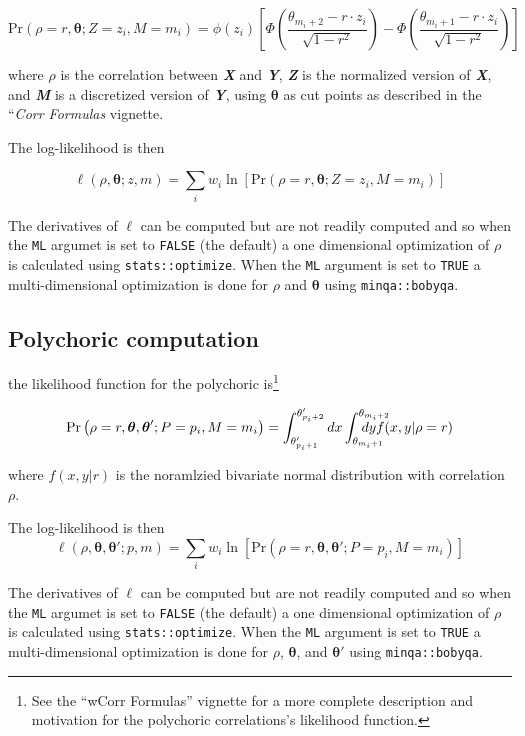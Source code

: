 \documentclass[]{article}
\let\rmarkdownfootnote\footnote%
\def\footnote{\protect\rmarkdownfootnote}
\begin{document}
\[\mathrm{Pr}\left( \rho=r, \boldsymbol{\theta} ; Z=z_i, M=m_i \right) = \phi(z_i) \left[ \Phi\left( \frac{\theta_{m_i+2} - r \cdot z_i}{\sqrt{1-r^2}} \right) - \Phi \left( \frac{\theta_{m_i+1} - r \cdot z_i}{\sqrt{1-r^2}} \right) \right]\]

where \(\rho\) is the correlation between \textbf{\emph{X}} and
\textbf{\emph{Y}}, \textbf{\emph{Z}} is the normalized version of
\textbf{\emph{X}}, and \textbf{\emph{M}} is a discretized version of
\textbf{\emph{Y}}, using \(\boldsymbol{\theta}\) as cut points as
described in the ``\emph{Corr Formulas} vignette.

The log-likelihood is then

\[\ell(\rho, \boldsymbol{\theta};z,m) = \sum_i w_i \ln\left[ \mathrm{Pr}\left( \rho=r, \boldsymbol{\theta} ; Z=z_i, M=m_i \right) \right]\]

The derivatives of \(\ell\) can be computed but are not readily computed
and so when the \texttt{ML} argumet is set to \texttt{FALSE} (the
default) a one dimensional optimization of \(\rho\) is calculated using
\texttt{stats::optimize}. When the \texttt{ML} argument is set to
\texttt{TRUE} a multi-dimensional optimization is done for \(\rho\) and
\(\boldsymbol{\theta}\) using \texttt{minqa::bobyqa}.

\subsection{Polychoric computation}\label{polychoric-computation}

the likelihood function for the polychoric is\footnote{See the ``wCorr
  Formulas'' vignette for a more complete description and motivation for
  the polychoric correlations's likelihood function.}

\[\mathrm{Pr}\left( \rho=r, \boldsymbol{\theta}, \boldsymbol{\theta}' ; P=p_i, M=m_i \right) = \int_{\theta_{p_i+1}'}^{\theta_{p_i+2}'} dx \int_{\theta_{m_i+1}}^{\theta_{m_i+2}} \mkern-40mu dy f(x,y|\rho=r)\]

where \(f(x,y|r)\) is the noramlzied bivariate normal distribution with
correlation \(\rho\).

The log-likelihood is then
\[\ell(\rho, \boldsymbol{\theta}, \boldsymbol{\theta}' ;p,m) = \sum_i w_i \ln\left[\mathrm{Pr}\left( \rho=r, \boldsymbol{\theta}, \boldsymbol{\theta}' ; P=p_i, M=m_i \right) \right] \]

The derivatives of \(\ell\) can be computed but are not readily computed
and so when the \texttt{ML} argumet is set to \texttt{FALSE} (the
default) a one dimensional optimization of \(\rho\) is calculated using
\texttt{stats::optimize}. When the \texttt{ML} argument is set to
\texttt{TRUE} a multi-dimensional optimization is done for \(\rho\),
\(\boldsymbol{\theta}\), and \(\boldsymbol{\theta}'\) using
\texttt{minqa::bobyqa}.
\end{document}
